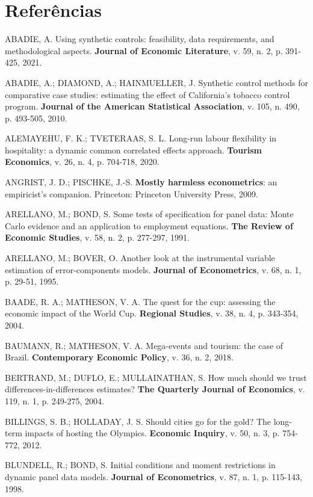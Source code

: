 \chapter*{Referências}
\begin{singlespace}\setlength{\parindent}{0pt}\setlength{\parskip}{8pt}\raggedright

ABADIE, A. Using synthetic controls: feasibility, data requirements, and methodological aspects. \textbf{Journal of Economic Literature}, v. 59, n. 2, p. 391-425, 2021.

ABADIE, A.; DIAMOND, A.; HAINMUELLER, J. Synthetic control methods for comparative case studies: estimating the effect of California's tobacco control program. \textbf{Journal of the American Statistical Association}, v. 105, n. 490, p. 493-505, 2010.

ALEMAYEHU, F. K.; TVETERAAS, S. L. Long-run labour flexibility in
hospitality: a dynamic common correlated effects approach. \textbf{Tourism
Economics}, v. 26, n. 4, p. 704-718, 2020.

ANGRIST, J. D.; PISCHKE, J.-S. \textbf{Mostly harmless econometrics}: an empiricist's companion. Princeton: Princeton University Press, 2009.

ARELLANO, M.; BOND, S. Some tests of specification for panel data: Monte Carlo evidence and an application to employment equations. \textbf{The Review of Economic Studies}, v. 58, n. 2, p. 277-297, 1991.

ARELLANO, M.; BOVER, O. Another look at the instrumental variable estimation of error-components models. \textbf{Journal of Econometrics}, v. 68, n. 1, p. 29-51, 1995.

BAADE, R. A.; MATHESON, V. A. The quest for the cup: assessing the economic impact of the World Cup. \textbf{Regional Studies}, v. 38, n. 4, p. 343-354, 2004.

BAUMANN, R.; MATHESON, V. A. Mega-events and tourism: the case of Brazil. \textbf{Contemporary Economic Policy}, v. 36, n. 2, 2018.

BERTRAND, M.; DUFLO, E.; MULLAINATHAN, S. How much should we trust differences-in-differences estimates? \textbf{The Quarterly Journal of Economics}, v. 119, n. 1, p. 249-275, 2004.

BILLINGS, S. B.; HOLLADAY, J. S. Should cities go for the gold? The long-term impacts of hosting the Olympics. \textbf{Economic Inquiry}, v. 50, n. 3, p. 754-772, 2012.

BLUNDELL, R.; BOND, S. Initial conditions and moment restrictions in dynamic panel data models. \textbf{Journal of Econometrics}, v. 87, n. 1, p. 115-143, 1998.


\end{singlespace}
